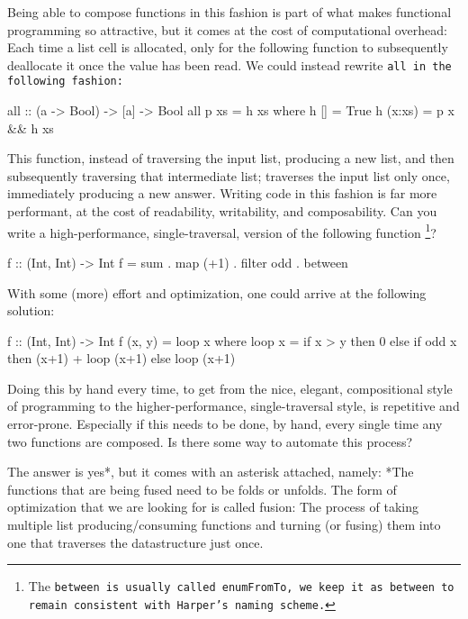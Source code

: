 Being able to compose functions in this fashion is part of what makes functional programming so attractive, but it comes at the cost of computational overhead:
Each time a list cell is allocated, only for the following function to subsequently deallocate it once the value has been read.
We could instead rewrite \tt{all} in the following fashion:
\begin{code}
all :: (a -> Bool) -> [a] -> Bool
all p xs = h xs
  where h []     = True
        h (x:xs) = p x && h xs
\end{code}
This function, instead of traversing the input list, producing a new list, and then subsequently traversing that intermediate list; traverses the input list only once, immediately producing a new answer.
Writing code in this fashion is far more performant, at the cost of readability, writability, and composability.
Can you write a high-performance, single-traversal, version of the following function \citep{Harper2011}\footnote{The \tt{between} is usually called \tt{enumFromTo}, we keep it as \tt{between} to remain consistent with Harper's naming scheme.}?
\begin{code}
f :: (Int, Int) -> Int
f = sum . map (+1) . filter odd . between
\end{code}
With some (more) effort and optimization, one could arrive at the following solution:
\begin{code}
f :: (Int, Int) -> Int
f (x, y) = loop x
  where loop x = if x > y
                 then 0
                 else if odd x
                      then (x+1) + loop (x+1)
                      else loop (x+1)
\end{code}
Doing this by hand every time, to get from the nice, elegant, compositional style of programming to the higher-performance, single-traversal style, is repetitive and error-prone.
Especially if this needs to be done, by hand, every single time any two functions are composed.
Is there some way to automate this process?

The answer is yes*, but it comes with an asterisk attached, namely: *The functions that are being fused need to be folds or unfolds.
The form of optimization that we are looking for is called fusion:
The process of taking multiple list producing/consuming functions and turning (or fusing) them into one that traverses the datastructure just once.

